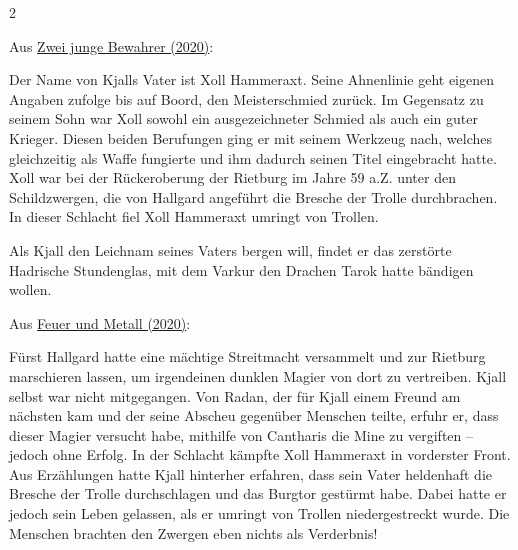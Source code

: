 \documentclass[10pt, a4paper, oneside]{book}
\begin{document}
\begin{multicols}{2}
\begin{center}
    Aus \hyperref[storytext-2020-zwei-junge-bewahrer]{Zwei junge Bewahrer (2020)}:
\end{center}

Der Name von Kjalls Vater ist Xoll Hammeraxt. Seine Ahnenlinie geht eigenen Angaben zufolge bis auf Boord, den Meisterschmied zurück. Im Gegensatz zu seinem Sohn war Xoll sowohl ein ausgezeichneter Schmied als auch ein guter Krieger. Diesen beiden Berufungen ging er mit seinem Werkzeug nach, welches gleichzeitig als Waffe fungierte und ihm dadurch seinen Titel eingebracht hatte. Xoll war bei der Rückeroberung der Rietburg im Jahre 59 a.Z. unter den Schildzwergen, die von Hallgard angeführt die Bresche der Trolle durchbrachen. In dieser Schlacht fiel Xoll Hammeraxt umringt von Trollen.

Als Kjall den Leichnam seines Vaters bergen will, findet er das zerstörte Hadrische Stundenglas, mit dem Varkur den Drachen Tarok hatte bändigen wollen.


\begin{center}
    Aus \hyperref[storytext-2020-feuer-und-metall]{Feuer und Metall (2020)}:
\end{center}

Fürst Hallgard hatte eine mächtige Streitmacht versammelt und zur Rietburg marschieren lassen, um irgendeinen dunklen Magier von dort zu vertreiben. Kjall selbst war nicht mitgegangen. Von Radan, der für Kjall einem Freund am nächsten kam und der seine Abscheu gegenüber Menschen teilte, erfuhr er, dass dieser Magier versucht habe, mithilfe von Cantharis die Mine zu vergiften – jedoch ohne Erfolg. In der Schlacht kämpfte Xoll Hammeraxt in vorderster Front. Aus Erzählungen hatte Kjall hinterher erfahren, dass sein Vater heldenhaft die Bresche der Trolle durchschlagen und das Burgtor gestürmt habe. Dabei hatte er jedoch sein Leben gelassen, als er umringt von Trollen niedergestreckt wurde. Die Menschen brachten den Zwergen eben nichts als Verderbnis!\bigskip


\end{multicols}
\end{document}
